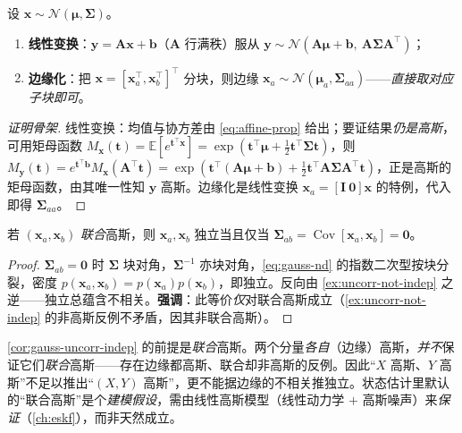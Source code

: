 \begin{theorem}[高斯在线性变换与边缘化下封闭]\label{thm:gauss-closed}
设 $\mathbf{x}\sim\mathcal{N}(\boldsymbol{\mu},\boldsymbol{\Sigma})$。
\begin{enumerate}
  \item \textbf{线性变换}：$\mathbf{y}=\mathbf{A}\mathbf{x}+\mathbf{b}$（$\mathbf{A}$ 行满秩）服从 $\mathbf{y}\sim\mathcal{N}(\mathbf{A}\boldsymbol{\mu}+\mathbf{b},\ \mathbf{A}\boldsymbol{\Sigma}\mathbf{A}^\top)$；
  \item \textbf{边缘化}：把 $\mathbf{x}=[\mathbf{x}_a^\top,\mathbf{x}_b^\top]^\top$ 分块，则边缘 $\mathbf{x}_a\sim\mathcal{N}(\boldsymbol{\mu}_a,\boldsymbol{\Sigma}_{aa})$——\emph{直接取对应子块即可}。
\end{enumerate}
\end{theorem}
\begin{proof}[证明骨架]
线性变换：均值与协方差由 \cref{eq:affine-prop} 给出；要证结果\emph{仍是高斯}，可用矩母函数 $M_{\mathbf{x}}(\mathbf{t})=\mathbb{E}[e^{\mathbf{t}^\top\mathbf{x}}]=\exp(\mathbf{t}^\top\boldsymbol{\mu}+\tfrac12\mathbf{t}^\top\boldsymbol{\Sigma}\mathbf{t})$，则 $M_{\mathbf{y}}(\mathbf{t})=e^{\mathbf{t}^\top\mathbf{b}}M_{\mathbf{x}}(\mathbf{A}^\top\mathbf{t})=\exp(\mathbf{t}^\top(\mathbf{A}\boldsymbol{\mu}+\mathbf{b})+\tfrac12\mathbf{t}^\top\mathbf{A}\boldsymbol{\Sigma}\mathbf{A}^\top\mathbf{t})$，正是高斯的矩母函数，由其唯一性知 $\mathbf{y}$ 高斯。边缘化是线性变换 $\mathbf{x}_a=[\mathbf{I}\ \mathbf{0}]\mathbf{x}$ 的特例，代入即得 $\boldsymbol{\Sigma}_{aa}$。
\end{proof}

\begin{corollary}\label{cor:gauss-uncorr-indep}
若 $(\mathbf{x}_a,\mathbf{x}_b)$ \emph{联合}高斯，则 $\mathbf{x}_a,\mathbf{x}_b$ 独立当且仅当 $\boldsymbol{\Sigma}_{ab}=\operatorname{Cov}[\mathbf{x}_a,\mathbf{x}_b]=\mathbf{0}$。
\end{corollary}
\begin{proof}
$\boldsymbol{\Sigma}_{ab}=\mathbf{0}$ 时 $\boldsymbol{\Sigma}$ 块对角，$\boldsymbol{\Sigma}^{-1}$ 亦块对角，\cref{eq:gauss-nd} 的指数二次型按块分裂，密度 $p(\mathbf{x}_a,\mathbf{x}_b)=p(\mathbf{x}_a)p(\mathbf{x}_b)$，即独立。反向由 \cref{ex:uncorr-not-indep} 之逆——独立总蕴含不相关。\textbf{强调}：此等价\emph{仅}对联合高斯成立（\cref{ex:uncorr-not-indep} 的非高斯反例不矛盾，因其非联合高斯）。
\end{proof}

\begin{pitfall}
\cref{cor:gauss-uncorr-indep} 的前提是\emph{联合}高斯。两个分量\emph{各自}（边缘）高斯，\emph{并不}保证它们\emph{联合}高斯——存在边缘都高斯、联合却非高斯的反例。因此“$X$ 高斯、$Y$ 高斯”不足以推出“$(X,Y)$ 高斯”，更不能据边缘的不相关推独立。状态估计里默认的“联合高斯”是个\emph{建模假设}，需由线性高斯模型（线性动力学 $+$ 高斯噪声）来\emph{保证}（\cref{ch:eskf}），而非天然成立。
\end{pitfall}

